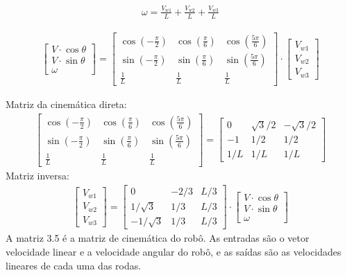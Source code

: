 \begin{equation*}
    \begin{split}
        \omega = 
        \frac{V_{w1}}{L}
        + \frac{V_{w2}}{L}
        + \frac{V_{w3}}{L}
    \end{split}
\end{equation*}

\begin{gather}
	\begin{bmatrix} V\cdot \cos{\theta} \\  V\cdot \sin{\theta} \\  \omega \end{bmatrix}
	=
	\begin{bmatrix}
		\cos{\left(-\frac{\pi}{2}\right)} & \cos{\left(\frac{\pi}{6}\right)} & \cos{\left(\frac{5\pi}{6}\right)} \\
		\sin{\left(-\frac{\pi}{2}\right)} & \sin{\left(\frac{\pi}{6}\right)} & \sin{\left(\frac{5\pi}{6}\right)} \\
		\frac{1}{L} & \frac{1}{L} & \frac{1}{L}
	\end{bmatrix}
	\cdot
	\begin{bmatrix} V_{w1} \\  V_{w2} \\  V_{w3} \end{bmatrix}
\end{gather}

Matriz da cinemática direta:
\begin{gather}
	\begin{bmatrix}
		\cos{\left(-\frac{\pi}{2}\right)} & \cos{\left(\frac{\pi}{6}\right)} & \cos{\left(\frac{5\pi}{6}\right)} \\
		\sin{\left(-\frac{\pi}{2}\right)} & \sin{\left(\frac{\pi}{6}\right)} & \sin{\left(\frac{5\pi}{6}\right)} \\
		\frac{1}{L} & \frac{1}{L} & \frac{1}{L}
	\end{bmatrix}
	=
	\begin{bmatrix}
		0 & \sqrt{3}/2 & -\sqrt{3}/2 \\
		-1 & 1/2 & 1/2  \\
		1/L & 1/L & 1/L
	\end{bmatrix}
\end{gather}
Matriz inversa:
\begin{gather}
	\begin{bmatrix} V_{w1} \\  V_{w2} \\  V_{w3} \end{bmatrix}
	=
	\begin{bmatrix}
		0 & -2/3 & L/3 \\
		1/\sqrt{3} & 1/3 & L/3\\
		-1/\sqrt{3} & 1/3 & L/3
	\end{bmatrix}
	\cdot
	\begin{bmatrix} V\cdot \cos{\theta} \\  V\cdot \sin{\theta} \\  \omega \end{bmatrix}
\end{gather}
A matriz 3.5 é a matriz de cinemática do robô.
As entradas são o vetor velocidade linear e a velocidade angular do robô, e as
saídas são as velocidades lineares de cada uma das rodas.

